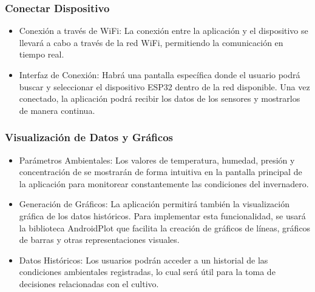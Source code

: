 \documentclass[../main]{subfiles}
\begin{document}
\subsubsection{Conectar Dispositivo}

\begin{itemize}
	\item Conexión a través de WiFi:
	      La conexión entre la aplicación y el dispositivo se llevará a cabo a
	      través de la red WiFi, permitiendo la comunicación en tiempo real.
	\item Interfaz de Conexión:
	      Habrá una pantalla específica donde el usuario podrá buscar y seleccionar
	      el dispositivo ESP32 dentro de la red disponible.
	      Una vez conectado, la aplicación podrá recibir los datos de los sensores
	      y mostrarlos de manera continua.

\end{itemize}

\subsubsection{Visualización de Datos y Gráficos}

\begin{itemize}
	\item Parámetros Ambientales:
	      Los valores de temperatura, humedad, presión y concentración de  se
	      mostrarán de forma intuitiva en la pantalla principal de la aplicación
	      para monitorear constantemente las condiciones del invernadero.
	\item Generación de Gráficos:
	      La aplicación permitirá también la visualización gráfica de los datos
	      históricos. Para implementar esta funcionalidad, se usará la biblioteca
	      AndroidPlot que facilita la creación de gráficos de líneas, gráficos de
	      barras y otras representaciones visuales.
	\item Datos Históricos:
	      Los usuarios podrán acceder a un historial de las condiciones ambientales
	      registradas, lo cual será útil para la toma de decisiones relacionadas
	      con el cultivo.
\end{itemize}
\end{document}
